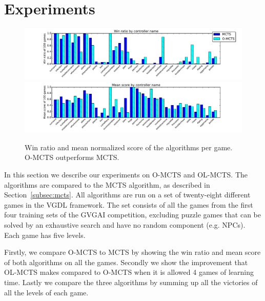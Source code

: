 \section{Experiments}
\label{sec:experiments}
\begin{figure}
\centering
	\includegraphics[width=\textwidth]{includes/wins}
	\includegraphics[width=\textwidth]{includes/scores}
	\vspace{-.8cm}
\caption{Win ratio and mean normalized score of the algorithms per game. O-MCTS
outperforms MCTS.}
\label{fig:scores}
\end{figure}

In this section we describe our experiments on O-MCTS and OL-MCTS\@. The
algorithms are compared to the MCTS algorithm, as described in
Section~\ref{subsec:mcts}. All algorithms are run on a set of twenty-eight
different games in the VGDL framework. The set consists of all the games from
the first four training sets of the GVGAI competition, excluding puzzle games
that can be solved by an exhaustive search and have no random component (e.g.
NPCs). Each game has five levels.

Firstly, we compare O-MCTS to MCTS by showing the win ratio and mean score of
both algorithms on all the games. Secondly we show the improvement that OL-MCTS
makes compared to O-MCTS when it is allowed 4 games of learning time. 
Lastly we compare the three algorithms by summing up all the victories of all
the levels of each game.  

